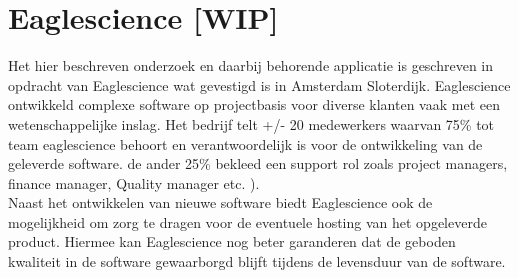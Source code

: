 \chapter{Eaglescience [WIP]} %

\label{ch:Eaglescience} %


Het hier beschreven onderzoek en daarbij behorende applicatie is geschreven in opdracht van Eaglescience wat gevestigd is in Amsterdam Sloterdijk. Eaglescience ontwikkeld complexe software op projectbasis voor diverse klanten vaak met een wetenschappelijke inslag. Het bedrijf telt +/- 20 medewerkers waarvan 75\% tot team eaglescience behoort en verantwoordelijk is voor de ontwikkeling van de geleverde software. de ander 25\% bekleed een support rol zoals project managers,  finance manager,  Quality manager etc. ). \\
Naast het ontwikkelen van nieuwe software biedt Eaglescience ook de mogelijkheid om zorg te dragen voor de eventuele hosting van het opgeleverde product. Hiermee kan Eaglescience nog beter garanderen dat de geboden kwaliteit in de software gewaarborgd blijft tijdens de levensduur van de software.


